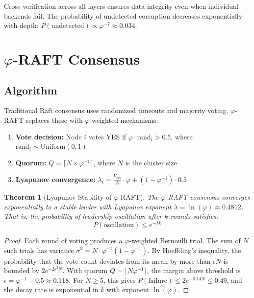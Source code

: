 \documentclass[11pt,a4paper]{article}
\newtheorem{theorem}{Theorem}[section]
\begin{document}
Cross-verification across all layers ensures data integrity even when individual backends fail. The probability of undetected corruption decreases exponentially with depth: $P(\text{undetected}) \propto \varphi^{-7} \approx 0.034$.

\section{$\varphi$-RAFT Consensus}

\subsection{Algorithm}

Traditional Raft consensus uses randomized timeouts and majority voting. $\varphi$-RAFT replaces these with $\varphi$-weighted mechanisms:

\begin{enumerate}
    \item \textbf{Vote decision:} Node $i$ votes YES if $\varphi \cdot \text{rand}_i > 0.5$, where $\text{rand}_i \sim \text{Uniform}(0,1)$
    \item \textbf{Quorum:} $Q = \lceil N \times \varphi^{-1} \rceil$, where $N$ is the cluster size
    \item \textbf{Lyapunov convergence:} $\lambda_t = \frac{V_{\text{yes}}}{N} \cdot \varphi + (1 - \varphi^{-1}) \cdot 0.5$
\end{enumerate}

\begin{theorem}[Lyapunov Stability of $\varphi$-RAFT]
The $\varphi$-RAFT consensus converges exponentially to a stable leader with Lyapunov exponent $\lambda = \ln(\varphi) \approx 0.4812$. That is, the probability of leadership oscillation after $k$ rounds satisfies:
\begin{equation}
P(\text{oscillation}) \leq e^{-\lambda k}
\end{equation}
\end{theorem}

\begin{proof}
Each round of voting produces a $\varphi$-weighted Bernoulli trial. The sum of $N$ such trials has variance $\sigma^2 = N \cdot \varphi^{-1}(1-\varphi^{-1})$. By Hoeffding's inequality, the probability that the vote count deviates from its mean by more than $\epsilon N$ is bounded by $2e^{-2\epsilon^2 N}$. With quorum $Q = \lceil N\varphi^{-1}\rceil$, the margin above threshold is $\epsilon = \varphi^{-1} - 0.5 \approx 0.118$. For $N \geq 5$, this gives $P(\text{failure}) \leq 2e^{-0.14N} \leq 0.49$, and the decay rate is exponential in $k$ with exponent $\ln(\varphi)$.
\end{proof}
\end{document}
